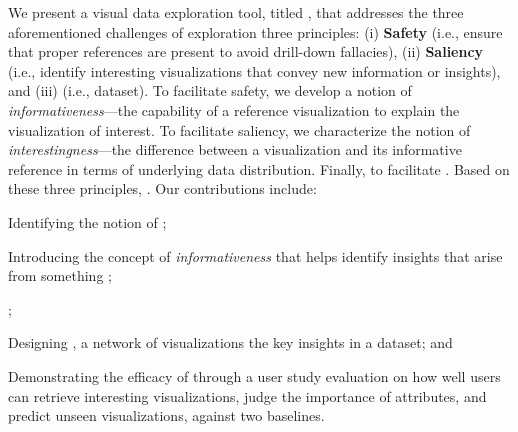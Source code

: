  \par
We present a visual data exploration tool, titled \system,
 that addresses the three aforementioned
 challenges of exploration 
 three principles:
 (i) \textbf{Safety}
 (i.e., ensure that proper
 references are present to
 avoid drill-down fallacies),
 (ii) \textbf{Saliency}
 (i.e., identify interesting visualizations
 that convey new information or insights),
 and (iii) 
 (i.e.,  dataset).
 To facilitate safety, we develop a
 notion of \emph{informativeness}---the capability
 of a reference 
 visualization to explain the visualization of interest.
 To facilitate saliency,
 we characterize the notion of \emph{interestingness}---the
 difference between a visualization and
 its informative reference
 in terms of underlying data distribution.
 Finally, to facilitate .
 Based on these three principles,
 .
 Our contributions include:
\begin{denselist}
\item Identifying
the notion of ;
\item Introducing the concept of \emph{informativeness}
that helps identify insights
that arise from something
;
\item {};
\item Designing \system,  a network of visualizations  the key insights in a dataset; and
\item Demonstrating the efficacy of \change{\system} through a user study evaluation on how well users can retrieve interesting visualizations, judge the importance of attributes, and predict unseen visualizations, against two baselines.
\end{denselist}
